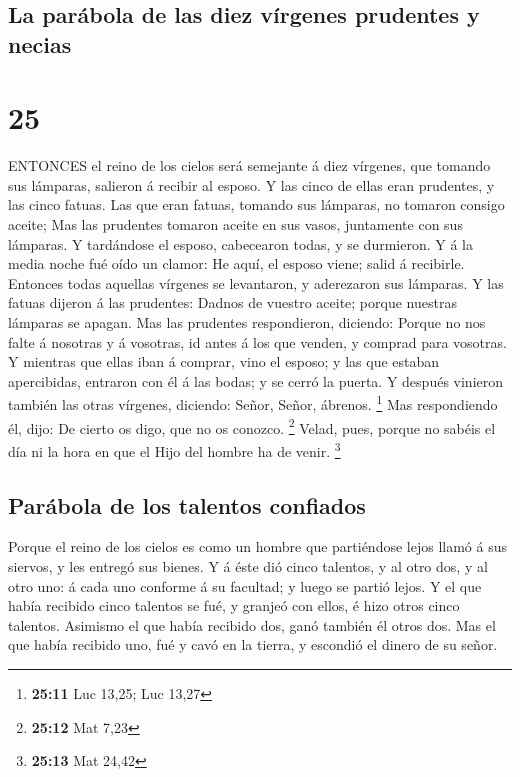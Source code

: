 \hypertarget{la-paruxe1bola-de-las-diez-vuxedrgenes-prudentes-y-necias}{%
\subsection{La parábola de las diez vírgenes prudentes y
necias}\label{la-paruxe1bola-de-las-diez-vuxedrgenes-prudentes-y-necias}}

\hypertarget{section-24}{%
\section{25}\label{section-24}}

 ENTONCES el reino de los cielos será semejante á diez
vírgenes, que tomando sus lámparas, salieron á recibir al esposo.
 Y las cinco de ellas eran prudentes, y las cinco fatuas.
 Las que eran fatuas, tomando sus lámparas, no tomaron
consigo aceite;  Mas las prudentes tomaron aceite en sus
vasos, juntamente con sus lámparas.  Y tardándose el esposo,
cabecearon todas, y se durmieron.  Y á la media noche fué
oído un clamor: He aquí, el esposo viene; salid á recibirle.
 Entonces todas aquellas vírgenes se levantaron, y
aderezaron sus lámparas.  Y las fatuas dijeron á las
prudentes: Dadnos de vuestro aceite; porque nuestras lámparas se apagan.
 Mas las prudentes respondieron, diciendo: Porque no nos
falte á nosotras y á vosotras, id antes á los que venden, y comprad para
vosotras.  Y mientras que ellas iban á comprar, vino el
esposo; y las que estaban apercibidas, entraron con él á las bodas; y se
cerró la puerta.  Y después vinieron también las otras
vírgenes, diciendo: Señor, Señor, ábrenos. \footnote{\textbf{25:11} Luc
  13,25; Luc 13,27}  Mas respondiendo él, dijo: De cierto
os digo, que no os conozco. \footnote{\textbf{25:12} Mat 7,23}
 Velad, pues, porque no sabéis el día ni la hora en que el
Hijo del hombre ha de venir. \footnote{\textbf{25:13} Mat 24,42}

\hypertarget{paruxe1bola-de-los-talentos-confiados}{%
\subsection{Parábola de los talentos
confiados}\label{paruxe1bola-de-los-talentos-confiados}}

 Porque el reino de los cielos es como un hombre que
partiéndose lejos llamó á sus siervos, y les entregó sus bienes.
 Y á éste dió cinco talentos, y al otro dos, y al otro uno:
á cada uno conforme á su facultad; y luego se partió lejos.
 Y el que había recibido cinco talentos se fué, y granjeó
con ellos, é hizo otros cinco talentos.  Asimismo el que
había recibido dos, ganó también él otros dos.  Mas el que
había recibido uno, fué y cavó en la tierra, y escondió el dinero de su
señor.


